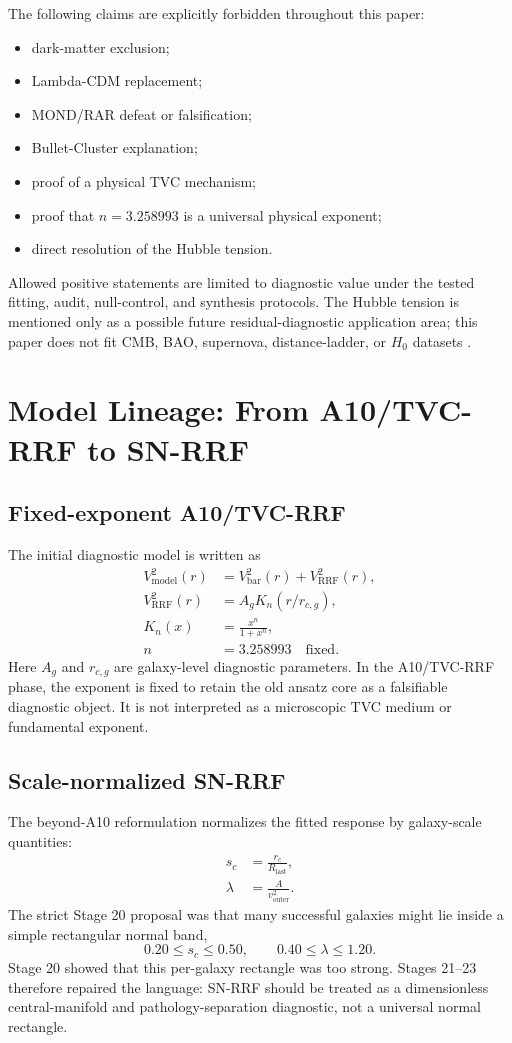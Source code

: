 \documentclass[11pt,a4paper]{article}
\newcommand{\rrf}{\mathrm{RRF}}
\newcommand{\vout}{v_{\mathrm{outer}}}
\newcommand{\rlast}{R_{\mathrm{last}}}
\newcommand{\scc}{s_c}
\newcommand{\lam}{\lambda}
\begin{document}
The following claims are explicitly forbidden throughout this paper:
\begin{itemize}
  \item dark-matter exclusion;
  \item Lambda-CDM replacement;
  \item MOND/RAR defeat or falsification;
  \item Bullet-Cluster explanation;
  \item proof of a physical TVC mechanism;
  \item proof that $n=3.258993$ is a universal physical exponent;
  \item direct resolution of the Hubble tension.
\end{itemize}

Allowed positive statements are limited to diagnostic value under the tested fitting, audit, null-control, and synthesis protocols. The Hubble tension is mentioned only as a possible future residual-diagnostic application area; this paper does not fit CMB, BAO, supernova, distance-ladder, or $H_0$ datasets \cite{Planck2020,Riess2022}.


\section{Model Lineage: From A10/TVC-RRF to SN-RRF}
\subsection{Fixed-exponent A10/TVC-RRF}
The initial diagnostic model is written as
\begin{align}
V^2_{\mathrm{model}}(r) &= V^2_{\mathrm{bar}}(r) + V^2_{\rrf}(r), \\
V^2_{\rrf}(r) &= A_g K_n(r/r_{c,g}), \\
K_n(x) &= \frac{x^n}{1+x^n}, \\
n &= 3.258993 \quad \text{fixed}. 
\end{align}
Here $A_g$ and $r_{c,g}$ are galaxy-level diagnostic parameters. In the A10/TVC-RRF phase, the exponent is fixed to retain the old ansatz core as a falsifiable diagnostic object. It is not interpreted as a microscopic TVC medium or fundamental exponent.

\subsection{Scale-normalized SN-RRF}
The beyond-A10 reformulation normalizes the fitted response by galaxy-scale quantities:
\begin{align}
\scc &= \frac{r_c}{\rlast}, \\
\lam &= \frac{A}{\vout^2}.
\end{align}
The strict Stage 20 proposal was that many successful galaxies might lie inside a simple rectangular normal band,
\begin{equation}
0.20 \leq \scc \leq 0.50, \qquad 0.40 \leq \lam \leq 1.20.
\end{equation}
Stage 20 showed that this per-galaxy rectangle was too strong. Stages 21--23 therefore repaired the language: SN-RRF should be treated as a dimensionless central-manifold and pathology-separation diagnostic, not a universal normal rectangle.
\end{document}
